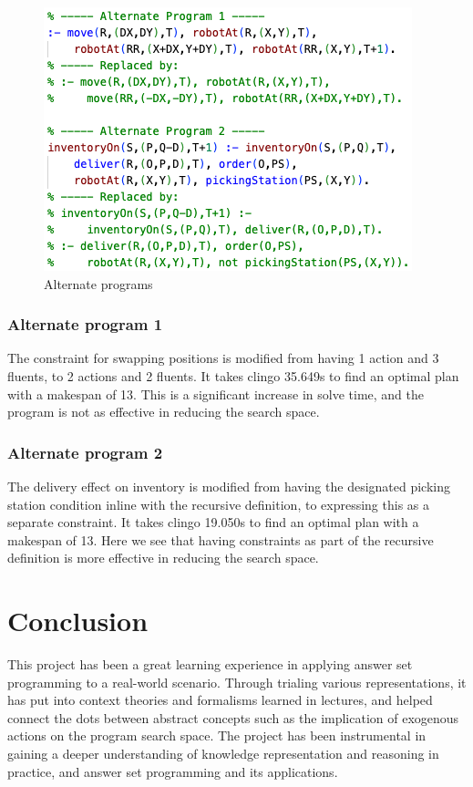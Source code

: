 \documentclass[letterpaper]{article}
\begin{document}
\begin{figure}[t]
    \centering
    \includegraphics[width=0.9\columnwidth]{alternate.png}
    \caption{Alternate programs}
\label{fig5:image}
\end{figure}

\subsubsection{Alternate program 1}
The constraint for swapping positions is modified from having 1 action and 3 fluents, to 2 actions and 2 fluents. It takes clingo 35.649s to find an optimal plan with a makespan of 13. This is a significant increase in solve time, and the program is not as effective in reducing the search space.

\subsubsection{Alternate program 2}
The delivery effect on inventory is modified from having the designated picking station condition inline with the recursive definition, to expressing this as a separate constraint. It takes clingo 19.050s to find an optimal plan with a makespan of 13. Here we see that having constraints as part of the recursive definition is more effective in reducing the search space.

\section{Conclusion}

This project has been a great learning experience in applying answer set programming to a real-world scenario. Through trialing various representations, it has put into context theories and formalisms learned in lectures, and helped connect the dots between abstract concepts such as the implication of exogenous actions on the program search space. The project has been instrumental in gaining a deeper understanding of knowledge representation and reasoning in practice, and answer set programming and its applications.
\end{document}

